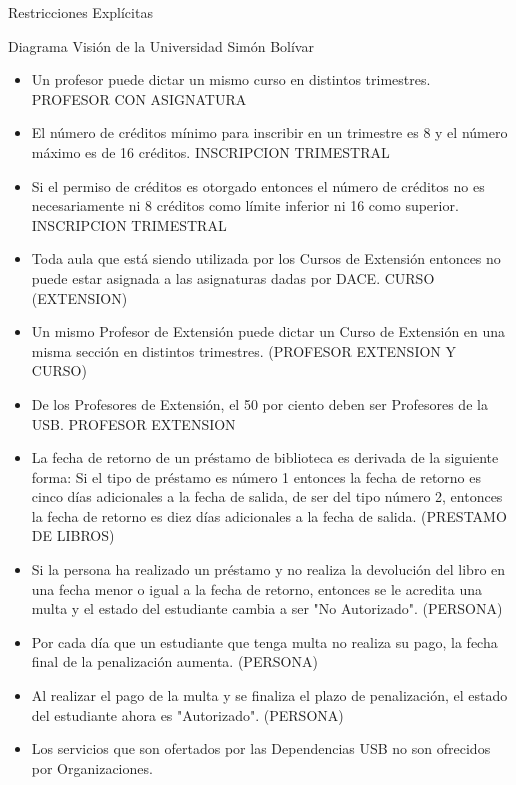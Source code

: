 Restricciones Expl\'icitas

Diagrama Visi\'on de la Universidad Sim\'on Bol\'ivar
\newline
\begin{itemize}
\item Un profesor puede dictar un mismo curso en distintos trimestres. PROFESOR CON ASIGNATURA
\item El n\'umero de cr\'editos m\'inimo para inscribir en un trimestre es 8 y el n\'umero m\'aximo es de 16 cr\'editos. INSCRIPCION TRIMESTRAL 
\item Si el permiso de cr\'editos es otorgado entonces el n\'umero de cr\'editos no es necesariamente ni 8 cr\'editos como l\'imite inferior ni 16 como superior. INSCRIPCION TRIMESTRAL
\item Toda aula que est\'a siendo utilizada por los Cursos de Extensi\'on entonces no puede estar asignada a las asignaturas dadas por DACE. CURSO (EXTENSION)
\item Un mismo Profesor  de Extensi\'on puede dictar un Curso de Extensi\'on en una misma secci\'on en distintos trimestres. (PROFESOR EXTENSION Y CURSO)
\item De los Profesores de Extensi\'on, el 50 por ciento deben ser Profesores de la USB. PROFESOR EXTENSION
\item La fecha de retorno de un pr\'estamo de biblioteca es derivada de la siguiente forma: Si el tipo de pr\'estamo es n\'umero 1 entonces la fecha de retorno es cinco d\'ias adicionales a la fecha de salida, de ser del tipo n\'umero 2, entonces la fecha de retorno es diez d\'ias adicionales a la fecha de salida. (PRESTAMO DE LIBROS)
\item Si la persona ha realizado un pr\'estamo y no realiza la devoluci\'on del libro en una fecha menor o igual a la fecha de retorno, entonces se le acredita una multa y el estado del estudiante cambia a ser "No Autorizado". (PERSONA)
\item Por cada d\'ia que un estudiante que tenga multa no realiza su pago, la fecha final de la penalizaci\'on aumenta. (PERSONA)
\item Al realizar el pago de la multa y se finaliza el plazo de penalizaci\'on, el estado del estudiante ahora es "Autorizado". (PERSONA)
\item Los servicios que son ofertados por las Dependencias USB no son ofrecidos por Organizaciones.
\end{itemize}

